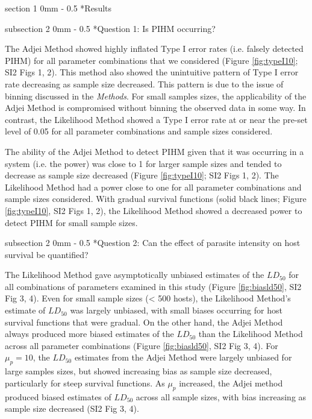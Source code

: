 \documentclass[12pt, a4paper]{article}
\makeatletter
\renewcommand{\section}{\@startsection
{section}%
{1}%
{0mm}%
{-\baselineskip}%
{0.5\baselineskip}%
{\normalfont\bf\large}} %
\renewcommand{\subsection}{\@startsection
{subsection}%
{2}%
{0mm}%
{-\baselineskip}%
{0.5\baselineskip}%
{\normalfont\bf}} %
\makeatother
\begin{document}
\section*{Results}

\subsection*{Question 1: Is PIHM occurring?}

The Adjei Method showed highly inflated Type I error rates (i.e. falsely detected
PIHM) for all parameter combinations that we
considered (Figure \ref{fig:typeI10}; SI2 Figs 1, 2).  This method also showed the unintuitive pattern of Type I error
rate decreasing as sample size decreased.  This pattern is due to the issue of
binning discussed in the \emph{Methods}. For small samples sizes, the
applicability of the Adjei Method is compromised without binning the observed
data in some way.  In contrast, the Likelihood Method showed a Type I
error rate at or near the pre-set level of 0.05 for all parameter combinations
and sample sizes considered.

The ability of the Adjei Method to detect PIHM given that it was occurring in a
system (i.e. the power) was close to 1 for larger sample sizes and tended to
decrease as sample size decreased (Figure \ref{fig:typeI10}; SI2 Figs 1, 2).  The Likelihood Method had a power close to
one for all parameter combinations and sample sizes considered.  With gradual
survival functions (solid black lines; Figure \ref{fig:typeI10}, SI2 Figs 1, 2), the Likelihood Method showed a
decreased power to detect PIHM for small sample sizes.


\subsection*{Question 2: Can the effect of parasite intensity on host survival be quantified?}

The Likelihood Method gave asymptotically unbiased estimates of the $LD_{50}$
for all combinations of parameters examined in this study (Figure \ref{fig:biasld50}, SI2 Fig 3, 4).  Even for
small sample sizes (< 500 hosts), the Likelihood Method's estimate of $LD_{50}$
was largely unbiased, with small biases occurring for host survival functions
that were gradual.  On the other hand, the Adjei Method
always produced more biased estimates of the $LD_{50}$ than the Likelihood
Method across all parameter combinations (Figure \ref{fig:biasld50}, SI2 Fig 3, 4).  For $\mu_p = 10$, the $LD_{50}$
estimates from the Adjei Method were largely unbiased for large samples sizes,
but showed increasing bias as sample size decreased, particularly for steep
survival functions.  As $\mu_p$ increased, the Adjei method
produced biased estimates of $LD_{50}$ across all sample sizes, with bias
increasing as sample size decreased (SI2 Fig 3, 4).
\end{document}
